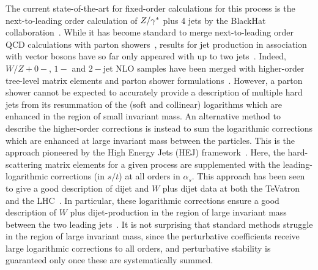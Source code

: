 	The current state-of-the-art for fixed-order calculations for this process is the
	next-to-leading order calculation of $Z/\gamma^*$ plus 4 jets by the BlackHat
	collaboration~\cite{Ita:2011wn}.
	While it has become standard to merge next-to-leading order QCD calculations
	with parton
	showers~\cite{Frixione:2002ik,Nason:2004rx,Frixione:2007vw,Alioli:2010xd,Frixione:2010wd,Alwall:2014hca},
	results for jet production in association with vector bosons have so far only appeared with up to two
	jets~\cite{Re:2012zi,Campbell:2013vha}.  Indeed, $W/Z+0-$, $1-$ and
	$2-$jet NLO samples have been merged with higher-order tree-level matrix
	elements and parton
	shower formulations~\cite{Hoeche:2012yf,Frederix:2015eii}. However, a parton shower cannot be expected to
	accurately provide a description of multiple hard jets from its resummation of
	the (soft and collinear) logarithms which are enhanced in the region of small
	invariant mass.  An alternative method to describe the higher-order
	corrections is instead to sum the logarithmic corrections which are enhanced at
	large invariant mass between the particles.  This is the approach pioneered by
	the High Energy Jets (HEJ) framework~\cite{Andersen:2009nu,Andersen:2009he}.
	Here, the hard-scattering matrix elements for a given process are supplemented
	with the leading-logarithmic corrections (in $s/t$) at all orders in
	$\alpha_s$. This approach has been seen to give a good description of dijet and
	$W$ plus dijet data at both the TeVatron~\cite{Abazov:2013gpa} and the
	LHC~\cite{Aad:2011jz,Chatrchyan:2012gwa,Chatrchyan:2012pb,Aad:2014pua,Aad:2014qxa}.
	In particular, these logarithmic corrections ensure a good description of $W$
	plus dijet-production in the region of large invariant mass between the
	two leading jets~\cite{Aad:2014qxa}. It is not surprising that standard
	methods struggle in the region of large invariant mass, since the
	perturbative coefficients receive large logarithmic corrections
	to all orders, and perturbative stability is guaranteed only once these are systematically summed.

